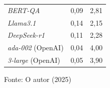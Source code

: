 \begin{table}[H]
\begin{minipage}{0.48\textwidth}
\begin{tabular}{ l r r }
            \textit{BERT-QA} & 0,09 & 2,81 \\
            \textit{Llama3.1} & 0,14 & 2,15 \\
            \textit{DeepSeek-r1} & 0,11 & 2,28 \\
            \textit{ada-002} (OpenAI) & 0,04 & 4,00 \\
            \textit{3-large} (OpenAI) & 0,05 & 3,90 \\
            \hline
        \end{tabular}
        \vspace{2mm}
        \small Fonte: O autor (2025)
        \label{tab:kmeans-conjunto-documentos2-sem-reducao}
    \end{minipage}

    \vspace{5mm} %


\end{table}
